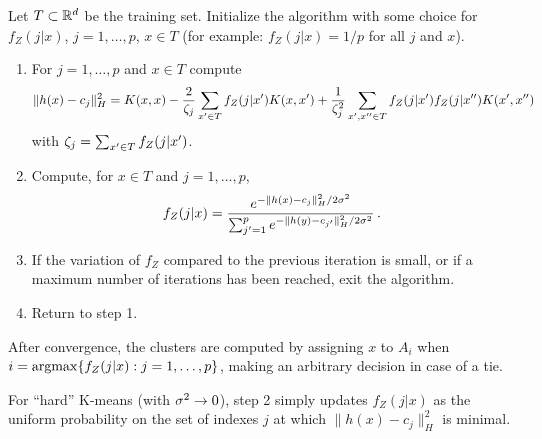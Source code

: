 \begin{algorithm}
\label{alg:clust.mog.2}
Let $T\subset {\mathbb{R}}^d$ be the training set.
Initialize the algorithm with some choice for $f_Z(j|x)$, $j=1, \ldots, p$, $x\in T$ (for example: $f_Z(j|x) = 1/p$ for all $j$ and $x$).
\begin{enumerate}[leftmargin=1cm]
\item For $j=1, \ldots, p$ and $x\in T$ compute
\[
\|h(x) - c_j\|_H^2= K(x,x) - \frac{2}{\zeta_j}
\sum_{x'\in T} f_Z(j|x') K(x,x') + \frac{1}{\zeta_j^2} \sum_{x',x''\in T}
f_Z(j|x')f_Z(j|x'') K(x', x'')
\]
with $\zeta_j = \sum_{x'\in T} f_Z(j|x')$.
\item Compute, for $x\in T$ and $j=1, \ldots, p$,
\[
f_Z(j|x) = \frac{e^{- \|h(x) - c_j\|_H^2/2\sigma^2}}{\sum_{j'=1}^p e^{- \|h(y) - c_{j'}\|_H^2/2\sigma^2}}\,.
\]
\item If the variation of $f_Z$ compared to the previous iteration is small, or if a maximum number of iterations has been reached, exit the algorithm.
\item Return to step 1.
\end{enumerate}
After convergence, the clusters are computed by assigning $x$ to $A_i$ when $i = \operatorname*{argmax}\{f_Z(j|x): j=1, \ldots, p\}$, making an arbitrary decision in case of a tie.
\end{algorithm}
For ``hard'' K-means (with $\sigma^2\to 0$), step 2 simply updates $f_Z(j|x)$ as the uniform probability on the set of indexes $j$ at which $\|h(x) - c_j\|_H^2$ is minimal.  

